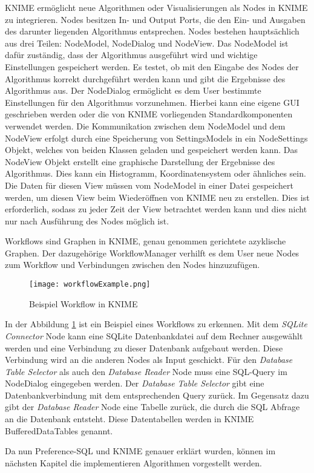 KNIME ermöglicht neue Algorithmen oder Visualisierungen als Nodes in KNIME zu integrieren. Nodes besitzen In- und Output Ports, die den Ein- und Ausgaben des darunter liegenden Algorithmus entsprechen. Nodes bestehen hauptsächlich aus drei Teilen: NodeModel, NodeDialog und NodeView. Das NodeModel ist dafür zuständig, dass der Algorithmus ausgeführt wird und wichtige Einstellungen gespeichert werden. Es testet, ob mit den Eingabe des Nodes der Algorithmus korrekt durchgeführt werden kann und gibt die Ergebnisse des Algorithmus aus. 
Der NodeDialog ermöglicht es dem User bestimmte Einstellungen für den Algorithmus vorzunehmen. Hierbei kann eine eigene GUI geschrieben werden oder die von KNIME vorliegenden Standardkomponenten verwendet werden. Die Kommunikation zwischen dem NodeModel und dem NodeView erfolgt durch eine Speicherung von SettingsModels in ein NodeSettings Objekt, welches von beiden Klassen geladen und gespeichert werden kann. 
Das NodeView Objekt erstellt eine graphische Darstellung der Ergebnisse des Algorithmus. Dies kann ein Histogramm, Koordinatensystem oder ähnliches sein. Die Daten für diesen View müssen vom NodeModel in einer Datei gespeichert werden, um diesen View beim Wiederöffnen von KNIME neu zu erstellen. Dies ist erforderlich, sodass zu jeder Zeit der View betrachtet werden kann und dies nicht nur nach Ausführung des Nodes möglich ist.

Workflows sind Graphen in KNIME, genau genommen gerichtete azyklische Graphen. Der dazugehörige WorkflowManager verhilft es dem User neue Nodes zum Workflow und Verbindungen zwischen den Nodes hinzuzufügen.

\begin{figure}[H]
	\centering
	\texttt{[image: workflowExample.png]}
	\caption{Beispiel Workflow in KNIME}
	\label{img:workflowExample}
\end{figure}

In der Abbildung \ref{img:workflowExample} ist ein Beispiel eines Workflows zu erkennen. Mit dem \textit{SQLite Connector} Node kann eine SQLite Datenbankdatei auf dem Rechner ausgewählt werden und eine Verbindung zu dieser Datenbank aufgebaut werden. Diese Verbindung wird an die anderen Nodes als Input geschickt. Für den \textit{Database Table Selector} als auch den \textit{Database Reader} Node muss eine SQL-Query im NodeDialog eingegeben werden. Der \textit{Database Table Selector} gibt eine Datenbankverbindung mit dem entsprechenden Query zurück. Im Gegensatz dazu gibt der \textit{Database Reader} Node eine Tabelle zurück, die durch die SQL Abfrage an die Datenbank entsteht. Diese Datentabellen werden in KNIME BufferedDataTables genannt. 

Da nun Preference-SQL und KNIME genauer erklärt wurden, können im nächsten Kapitel die implementieren Algorithmen vorgestellt werden.
